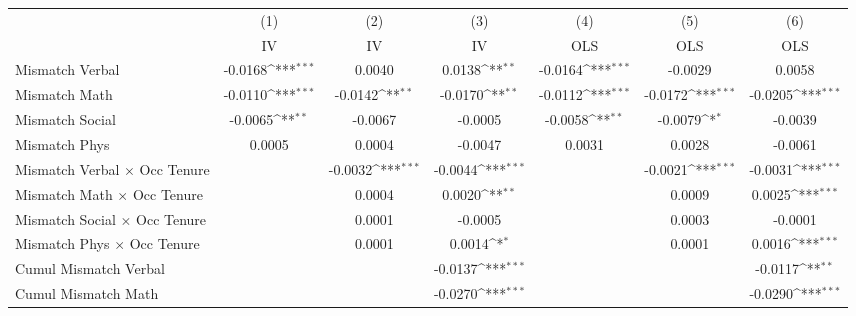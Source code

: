 {
\def\sym#1{\ifmmode^{#1}\else\(^{#1}\)\fi}
\begin{tabular}{l*{6}{c}}
\hline  
                    &\multicolumn{1}{c}{(1)}&\multicolumn{1}{c}{(2)}&\multicolumn{1}{c}{(3)}&\multicolumn{1}{c}{(4)}&\multicolumn{1}{c}{(5)}&\multicolumn{1}{c}{(6)}\\
                    &\multicolumn{1}{c}{IV}&\multicolumn{1}{c}{IV}&\multicolumn{1}{c}{IV}&\multicolumn{1}{c}{OLS}&\multicolumn{1}{c}{OLS}&\multicolumn{1}{c}{OLS}\\
\hline  
Mismatch Verbal     &     -0.0168\sym{***}&      0.0040         &      0.0138\sym{**} &     -0.0164\sym{***}&     -0.0029         &      0.0058         \\
[1em]
Mismatch Math       &     -0.0110\sym{***}&     -0.0142\sym{**} &     -0.0170\sym{**} &     -0.0112\sym{***}&     -0.0172\sym{***}&     -0.0205\sym{***}\\
[1em]
Mismatch Social     &     -0.0065\sym{**} &     -0.0067         &     -0.0005         &     -0.0058\sym{**} &     -0.0079\sym{*}  &     -0.0039         \\
[1em]
Mismatch Phys       &      0.0005         &      0.0004         &     -0.0047         &      0.0031         &      0.0028         &     -0.0061         \\
[1em]
Mismatch Verbal $\times$ Occ Tenure&                     &     -0.0032\sym{***}&     -0.0044\sym{***}&                     &     -0.0021\sym{***}&     -0.0031\sym{***}\\
[1em]
Mismatch Math $\times$ Occ Tenure&                     &      0.0004         &      0.0020\sym{**} &                     &      0.0009         &      0.0025\sym{***}\\
[1em]
Mismatch Social $\times$ Occ Tenure&                     &      0.0001         &     -0.0005         &                     &      0.0003         &     -0.0001         \\
[1em]
Mismatch Phys $\times$ Occ Tenure&                     &      0.0001         &      0.0014\sym{*}  &                     &      0.0001         &      0.0016\sym{***}\\
[1em]
Cumul Mismatch Verbal&                     &                     &     -0.0137\sym{***}&                     &                     &     -0.0117\sym{**} \\
[1em]
Cumul Mismatch Math &                     &                     &     -0.0270\sym{***}&                     &                     &     -0.0290\sym{***}\\

\end{tabular}}
